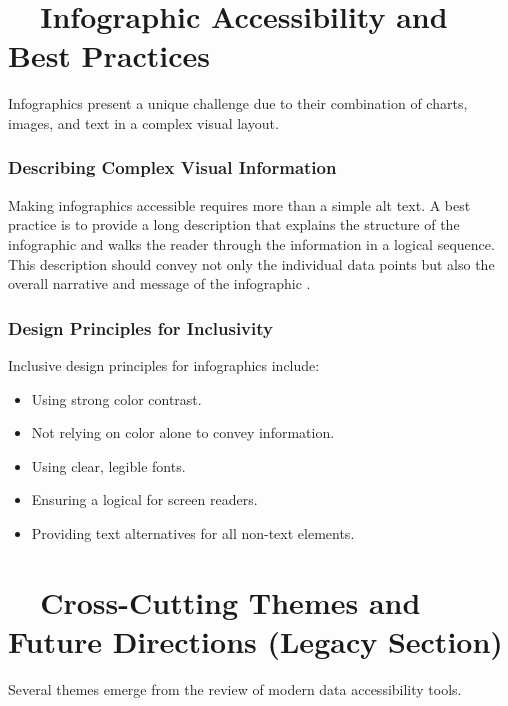 \section{~~Infographic Accessibility and Best Practices}\label{ch13:sec:infographics}
Infographics present a unique challenge due to their combination of charts, images, and text in a complex visual layout.

\subsubsection{Describing Complex Visual Information}\label{ch13:sssec:describing-infographics}
Making infographics accessible requires more than a simple alt text. A best practice is to provide a long description that explains the structure of the infographic and walks the reader through the information in a logical sequence. This description should convey not only the individual data points but also the overall narrative and message of the infographic \supercite{CreatingAccessibleInfographics, AdaptingInfographics}.

\subsubsection{Design Principles for Inclusivity}\label{ch13:sssec:inclusive-design}
Inclusive design principles for infographics include:
\begin{itemize}
	\item Using strong color contrast.
	\item Not relying on color alone to convey information.
	\item Using clear, legible fonts.
	\item Ensuring a logical  for screen readers.
	\item Providing text alternatives for all non-text elements.
\end{itemize}
\supercite{DoNoHarmGuide, ContrastChecker, WCAG21LevelAA}

\section{~~Cross-Cutting Themes and Future Directions (Legacy Section)}\label{ch13:sec:future-directions-legacy}
Several themes emerge from the review of modern data accessibility tools.

